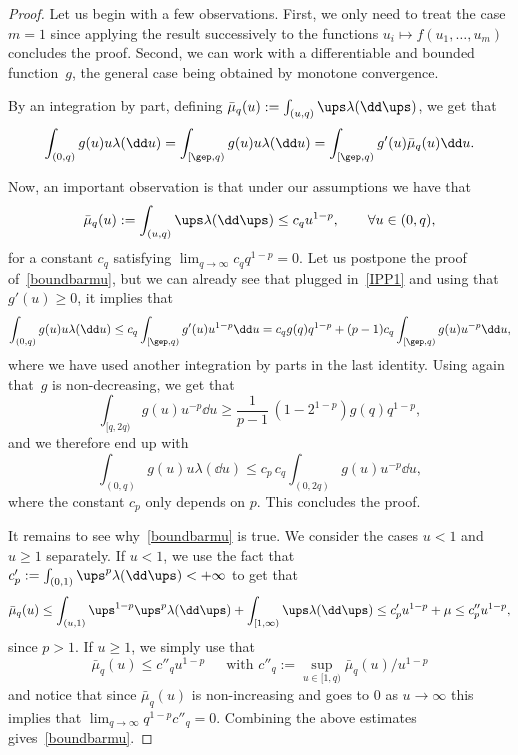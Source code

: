 \begin{proof}
Let us begin with a few observations.
First, we only need to treat the case $m=1$ since
applying the result successively to the functions $u_i\mapsto f(u_1, \ldots, u_m)$ concludes the proof.
Second, we can work with a differentiable and bounded
function~$g$, the general case being obtained by monotone convergence.

By an integration by part, defining $\bar \mu_q(u) := \int_{(u,q)} \ups \lambda(\dd \ups)$,
we get that
\begin{equation}
\label{IPP1}
\int_{(0,q)} g(u) u \lambda(\dd u) = \int_{[\gep,q)}
g(u) u \lambda(\dd u) = \int_{ [\gep,q)} g'(u) \bar \mu_q(u) \dd u.
\end{equation}

Now, an important observation is that under our assumptions we have that
\begin{equation}
\label{boundbarmu}
\bar \mu_q(u) := \int_{(u,q)} \ups \lambda(\dd \ups) \leq c_q u^{1-p}, \qquad \forall  u \in (0,q),
\end{equation}
for a constant $c_q$ satisfying $\lim_{q\to\infty} c_q q^{1-p} =0$.
Let us postpone the proof of~\eqref{boundbarmu},
but we can already see that plugged in~\eqref{IPP1} and using that $g'(u) \geq 0$, it implies that
\[
\int_{(0,q)} g(u) u \lambda(\dd u)
\leq c_q \int_{ [\gep,q)} g'(u) u^{1-p} \dd u =
c_q g(q) q^{1-p} + (p-1) c_q \int_{[\gep,q)} g(u) u^{ -p} \dd u,
\]
where we have used another integration by parts in the last identity.
Using again that~$g$ is non-decreasing, we get that
\[
\int_{[q,2q)} g(u) u^{-p} \dd u \geq \frac{1}{p-1}\, (1-2^{1-p}) g(q) q^{1-p},
\]
and we therefore end up with
\[
\int_{(0,q)} g(u) u \lambda(\dd u) \leq c_p \, c_q \int_{(0,2q)} g(u) u^{ -p} \dd u,
\]
where the constant $c_p$ only depends on $p$.
This concludes the proof.

It remains to see why~\eqref{boundbarmu} is true.
We consider the cases $u<1$ and $u\geq 1$ separately.
If $u < 1$, we use the fact that $c'_p:=\int_{(0,1)} \ups^{p} \lambda(\dd \ups) <+\infty$ to get that
\[
\bar \mu_q(u)
\leq \int_{(u,1)} \ups^{1-p} \ups^p \lambda(\dd \ups) +\int_{[1,\infty)} \ups \lambda(\dd \ups)
\leq c'_p u^{1-p} + \mu \leq c''_p u^{1-p},
\]
since $p>1$.
If $u\geq 1$, we simply use that
\[
\bar \mu_q(u)
\leq c''_q u^{1-p} \, \quad \text{ with } c''_q := \sup_{u\in [1,q)} \bar \mu_q(u) /u^{1-p}
\]
and notice that since $ \bar \mu_q(u)$ is non-increasing and goes to $0$ as $u\to\infty$
this implies that $\lim_{q\to\infty} q^{1-p} c''_q =0$.
Combining the above estimates gives~\eqref{boundbarmu}.
\end{proof}

